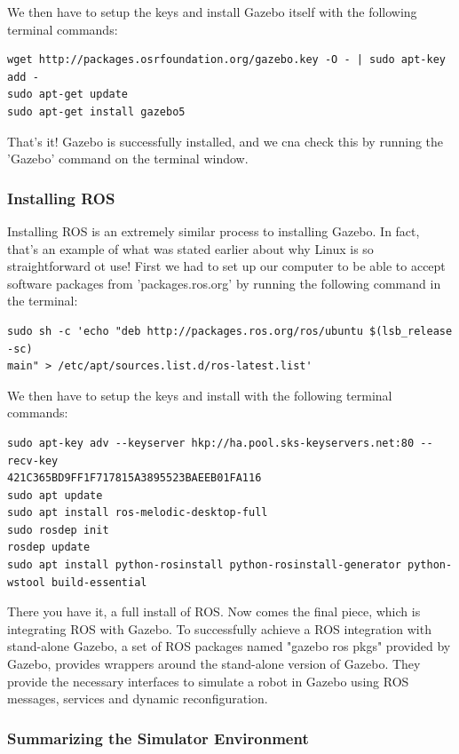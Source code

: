 \documentclass[12pt]{report}
\begin{document}
We then have to setup the keys and install Gazebo itself with the following terminal commands: 
\begin{verbatim}
wget http://packages.osrfoundation.org/gazebo.key -O - | sudo apt-key add -
sudo apt-get update
sudo apt-get install gazebo5
\end{verbatim}

That's it! Gazebo is successfully installed, and we cna check this by running the 'Gazebo' command on the terminal window.

\subsubsection*{Installing ROS}

Installing ROS is an extremely similar process to installing Gazebo. In fact, that's an example of what was stated earlier about why Linux is so straightforward ot use! First we had to set up our computer to be able to accept software packages from 'packages.ros.org' by running the following command in the terminal:

\begin{verbatim}
sudo sh -c 'echo "deb http://packages.ros.org/ros/ubuntu $(lsb_release -sc) 
main" > /etc/apt/sources.list.d/ros-latest.list'
\end{verbatim}

We then have to setup the keys and install with the following terminal commands: 

\begin{verbatim}
sudo apt-key adv --keyserver hkp://ha.pool.sks-keyservers.net:80 --recv-key 
421C365BD9FF1F717815A3895523BAEEB01FA116
sudo apt update
sudo apt install ros-melodic-desktop-full
sudo rosdep init
rosdep update
sudo apt install python-rosinstall python-rosinstall-generator python-wstool build-essential
\end{verbatim}

There you have it, a full install of ROS. Now comes the final piece, which is integrating ROS with Gazebo. To successfully achieve a ROS integration with stand-alone Gazebo, a set of ROS packages named "gazebo ros pkgs" provided by Gazebo, provides wrappers around the stand-alone version of Gazebo.\cite{GazeboRosIntegration} They provide the necessary interfaces to simulate a robot in Gazebo using ROS messages, services and dynamic reconfiguration. 


\subsubsection*{Summarizing the Simulator Environment}
\end{document}
